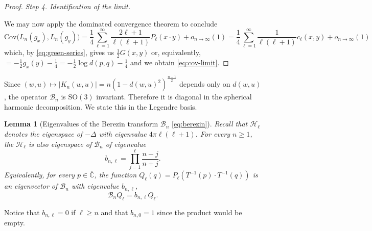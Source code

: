 \documentclass[10pt,reqno]{amsart}
\numberwithin{equation}{section}
\numberwithin{figure}{section}
\theoremstyle{plain}
\newtheorem{lemma}[theorem]{Lemma}
\newcommand{\<}{\langle}
\renewcommand{\>}{\rangle}
\begin{document}
\begin{proof}
\vspace{2mm}
  \noindent
  \emph{Step 4. Identification of the limit.} 

\vspace{2mm}
  \noindent
  We may
  now apply the dominated convergence theorem to conclude
  \begin{equation}
    \mathrm{Cov}\big(L_n(g_x),L_n(g_y)\big)
    = \frac14\sum_{\ell=1}^\infty \frac{2\ell+1}{\ell(\ell+1)}P_\ell(x \cdot y)+o_{n\to\infty}(1)
    = \frac14\sum_{\ell=1}^\infty \frac{1}{\ell(\ell+1)}c_\ell(x,y)+o_{n\to\infty}(1)
  \end{equation}
    which, by \eqref{eq:green-series},
    gives us
    $\frac{1}{2} G(x,y)$ or, equivalently, $
    = - \frac{1}{2} g_x(y) - \frac{1}{4}
    = - \frac{1}{2}\log d(p,q) - \frac{1}{4}$
  and we obtain \eqref{eq:cov-limit}.
\end{proof}

Since $(w,u)\mapsto |K_n(w,u)|=n(1-d(w,u)^2)^{\frac{n-1}{2}}$ depends only on
$d(w,u)$, the operator $\mathcal{B}_n$ is $\mathrm{SO}(3)$ invariant. Therefore it is
diagonal in the spherical harmonic decomposition. We state this in the
Legendre basis.

\begin{lemma}[Eigenvalues of the Berezin transform
  $\mathcal{B}_n$ \eqref{eq:berezin}]\label{lem:eigenvalues}
  Recall that
  $\mathcal H_\ell$ denotes the eigenspace
  of $-\Delta$ with eigenvalue $4\pi \ell (\ell+1)$.
  For every $n\geq1$, the 
  $\mathcal H_\ell$ is also eigenspace of 
  $\mathcal B_n$ of eigenvalue
\begin{equation}\label{eq:eigenvalue-formula}
    b_{n,\ell}
      =\prod_{j=1}^{\ell}\frac{n-j}{n+j}.
  \end{equation}
  Equivalently, for every $p \in 
  \overline{\mathbb C}$, the function
  $Q_\ell(q) = P_\ell(T^{-1}(p) \cdot T^{-1}(q))$
  is an eigenvector
  of $\mathcal B_n$ with eigenvalue
  $b_{n,\ell}$,
  \[\mathcal B_n Q_\ell = b_{n,\ell} Q_\ell.\]
  

\end{lemma}

Notice that $b_{n,\ell} = 0$ if $\ell \geq n$ and that
$b_{n,0} = 1$ since the product would be empty.
\end{document}
